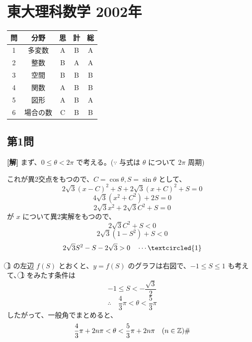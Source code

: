 \documentclass[../main.tex]{subfiles}
\begin{document}
\section*{東大理科数学 2002年}

\begin{center}
  \begin{tabular}{|c|c|c|c|c|}
    \hline
    問 & 分野 & 思 & 計 & 総 \\ \hline
    1 & 多変数 & A & B & A \\ \hline
    2 & 整数 & B & A & A \\ \hline
    3 & 空間 & B & B & B \\ \hline
    4 & 関数 & A & B & B \\ \hline
    5 & 図形 & A & B & A \\ \hline
    6 & 場合の数 & C & B & B \\ \hline
  \end{tabular}
\end{center}

\bigskip

\subsection*{第1問}

\noindent
\textbf{[解]} まず、$0 \le \theta < 2\pi$ で考える。($\because$ 与式は $\theta$ について $2\pi$ 周期)

\noindent
これが異2交点をもつので、$C = \cos\theta, S = \sin\theta$ として、
\[
  2\sqrt{3}(x-C)^2 + S + 2\sqrt{3}(x+C)^2 + S = 0
\]
\[
  4\sqrt{3}(x^2 + C^2) + 2S = 0
\]
\[
  2\sqrt{3}x^2 + 2\sqrt{3}C^2 + S = 0
\]
が $x$ について異2実解をもつので、
\[
  2\sqrt{3}C^2 + S < 0
\]
\[
  2\sqrt{3}(1-S^2) + S < 0
\]
\[
  2\sqrt{3}S^2 - S - 2\sqrt{3} > 0 \quad \cdots \textcircled{1}
\]

\noindent
\textcircled{1} の左辺 $f(S)$ とおくと、$y = f(S)$ のグラフは右図で、$-1 \le S \le 1$ も考えて、\textcircled{1} をみたす条件は
\[
  -1 \le S < -\frac{\sqrt{3}}{2}
\]
\[
  \therefore \quad \frac{4}{3}\pi < \theta < \frac{5}{3}\pi
\]
したがって、一般角でまとめると、
\[
  \frac{4}{3}\pi + 2n\pi < \theta < \frac{5}{3}\pi + 2n\pi \quad (n \in \mathbb{Z}) \hfill \text{\#}
\]

\begin{center}
\end{center}
\end{document}
